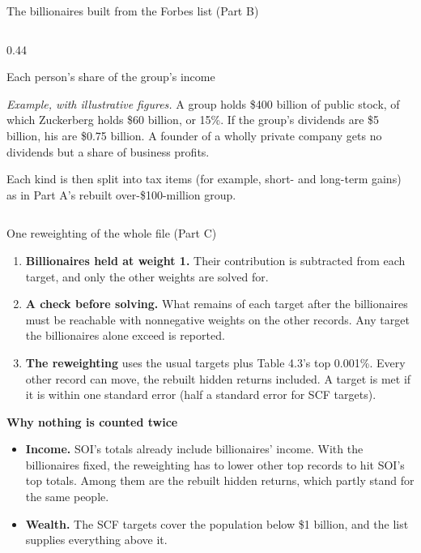 \begin{frame}{The billionaires built from the Forbes list (Part B)}
\begin{columns}[T]
\begin{column}{0.44\textwidth}
\begin{block}{Each person's share of the group's income}
\begin{itemize}
        \end{itemize}
        \vspace{0.1em}
        \textit{Example, with illustrative figures.} A group holds \$400 billion of public stock, of which Zuckerberg holds \$60
        billion, or 15\%. If the group's dividends are \$5 billion, his are \$0.75 billion. A founder of a
        wholly private company gets no dividends but a share of business profits.
      \end{block}
      Each kind is then split into tax items (for example, short- and long-term gains) as in Part A's
      rebuilt over-\$100-million group.
    \end{column}
  \end{columns}
\end{frame}

\begin{frame}{One reweighting of the whole file (Part C)}
  \footnotesize
  \begin{enumerate}
    \item \textbf{Billionaires held at weight 1.} Their contribution is subtracted from each target, and
          only the other weights are solved for.
    \vspace{0.3em}
    \item \textbf{A check before solving.} What remains of each target after the billionaires must be
          reachable with nonnegative weights on the other records. Any target the billionaires alone
          exceed is reported.
    \vspace{0.3em}
    \item \textbf{The reweighting} uses the usual targets plus Table 4.3's top 0.001\%. Every other record
          can move, the rebuilt hidden returns included. A target is met if it is within one standard
          error (half a standard error for SCF targets).
  \end{enumerate}
  \vspace{0.6em}
  \textbf{Why nothing is counted twice}
  \begin{itemize}
    \item \textbf{Income.} SOI's totals already include billionaires' income. With the billionaires fixed,
          the reweighting has to lower other top records to hit SOI's top totals. Among them are the rebuilt
          hidden returns, which partly stand for the same people.
    \item \textbf{Wealth.} The SCF targets cover the population below \$1 billion, and the list supplies
          everything above it.
  \end{itemize}
\end{frame}

